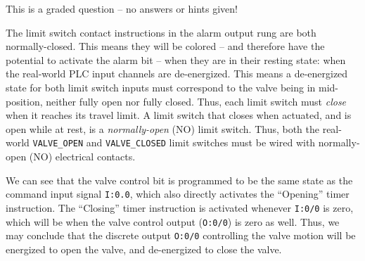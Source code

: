 \vfil
{}
\eject






This is a graded question -- no answers or hints given!







The limit switch contact instructions in the alarm output rung are both normally-closed.  This means they will be colored -- and therefore have the potential to activate the alarm bit -- when they are in their resting state: when the real-world PLC input channels are de-energized.  This means a de-energized state for both limit switch inputs must correspond to the valve being in mid-position, neither fully open nor fully closed.  Thus, each limit switch must {\it close} when it reaches its travel limit.  A limit switch that closes when actuated, and is open while at rest, is a {\it normally-open} (NO) limit switch.  Thus, both the real-world {\tt VALVE\_OPEN} and {\tt VALVE\_CLOSED} limit switches must be wired with normally-open (NO) electrical contacts.

\vskip 10pt

We can see that the valve control bit is programmed to be the same state as the command input signal {\tt I:0.0}, which also directly activates the ``Opening'' timer instruction.  The ``Closing'' timer instruction is activated whenever {\tt I:0/0} is zero, which will be when the valve control output ({\tt O:0/0}) is zero as well.  Thus, we may conclude that the discrete output {\tt O:0/0} controlling the valve motion will be energized to open the valve, and de-energized to close the valve.






